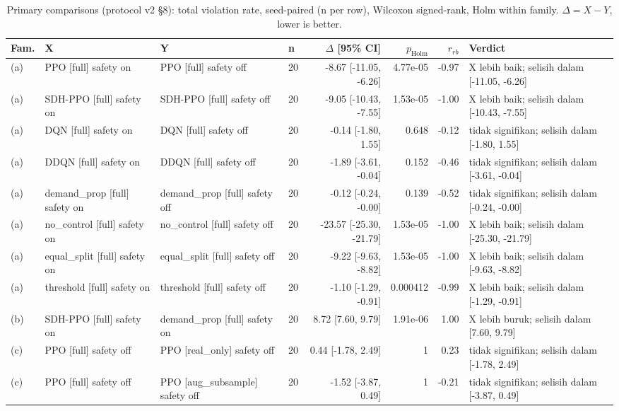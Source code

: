 \begin{table}[t]
\centering
\footnotesize
\caption{Primary comparisons (protocol v2 \S8): total violation rate, seed-paired (n per row), Wilcoxon signed-rank, Holm within family. $\Delta = X - Y$, lower is better.}
\label{tab:primary_v2}
\begin{tabular}{llllrrrl}
\toprule
Fam. & X & Y & n & $\Delta$ [95\% CI] & $p_{\mathrm{Holm}}$ & $r_{rb}$ & Verdict \\
\midrule
(a) & PPO [full] safety on & PPO [full] safety off & 20 & -8.67 [-11.05, -6.26] & 4.77e-05 & -0.97 & X lebih baik; selisih dalam [-11.05, -6.26] \\
(a) & SDH-PPO [full] safety on & SDH-PPO [full] safety off & 20 & -9.05 [-10.43, -7.55] & 1.53e-05 & -1.00 & X lebih baik; selisih dalam [-10.43, -7.55] \\
(a) & DQN [full] safety on & DQN [full] safety off & 20 & -0.14 [-1.80, 1.55] & 0.648 & -0.12 & tidak signifikan; selisih dalam [-1.80, 1.55] \\
(a) & DDQN [full] safety on & DDQN [full] safety off & 20 & -1.89 [-3.61, -0.04] & 0.152 & -0.46 & tidak signifikan; selisih dalam [-3.61, -0.04] \\
(a) & demand\_prop [full] safety on & demand\_prop [full] safety off & 20 & -0.12 [-0.24, -0.00] & 0.139 & -0.52 & tidak signifikan; selisih dalam [-0.24, -0.00] \\
(a) & no\_control [full] safety on & no\_control [full] safety off & 20 & -23.57 [-25.30, -21.79] & 1.53e-05 & -1.00 & X lebih baik; selisih dalam [-25.30, -21.79] \\
(a) & equal\_split [full] safety on & equal\_split [full] safety off & 20 & -9.22 [-9.63, -8.82] & 1.53e-05 & -1.00 & X lebih baik; selisih dalam [-9.63, -8.82] \\
(a) & threshold [full] safety on & threshold [full] safety off & 20 & -1.10 [-1.29, -0.91] & 0.000412 & -0.99 & X lebih baik; selisih dalam [-1.29, -0.91] \\
(b) & SDH-PPO [full] safety on & demand\_prop [full] safety on & 20 & 8.72 [7.60, 9.79] & 1.91e-06 & 1.00 & X lebih buruk; selisih dalam [7.60, 9.79] \\
(c) & PPO [full] safety off & PPO [real\_only] safety off & 20 & 0.44 [-1.78, 2.49] & 1 & 0.23 & tidak signifikan; selisih dalam [-1.78, 2.49] \\
(c) & PPO [full] safety off & PPO [aug\_subsample] safety off & 20 & -1.52 [-3.87, 0.49] & 1 & -0.21 & tidak signifikan; selisih dalam [-3.87, 0.49] \\

\end{tabular}
\end{table}
